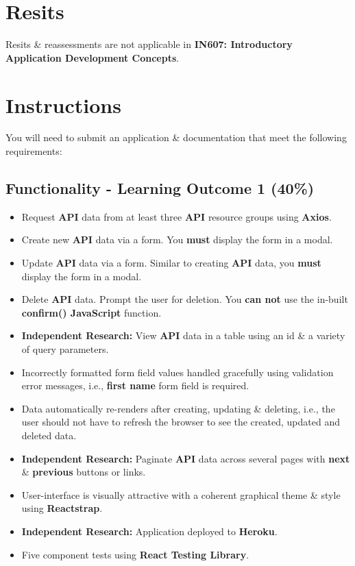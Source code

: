 \documentclass{article}
\begin{document}
\section*{Resits}
Resits \& reassessments are not applicable in \textbf{IN607: Introductory Application Development Concepts}. 

\newpage

\section*{Instructions}
You will need to submit an application \& documentation that meet the following requirements:

\subsection*{Functionality - Learning Outcome 1 (40\%)}

\begin{itemize}
        \item Request \textbf{API} data from at least three \textbf{API} resource groups using \textbf{Axios}.
        \item Create new \textbf{API} data via a form. You \textbf{must} display the form in a modal. 
        \item Update \textbf{API} data via a form. Similar to creating \textbf{API} data, you \textbf{must} display the form in a modal. 
        \item Delete \textbf{API} data. Prompt the user for deletion. You \textbf{can not} use the in-built \textbf{confirm() JavaScript} function. 
        \item \textbf{Independent Research:} View \textbf{API} data in a table using an id \& a variety of query parameters. 
        \item Incorrectly formatted form field values handled gracefully using validation error messages, i.e., \textbf{first name} form field is required.
    \item Data automatically re-renders after creating, updating \& deleting, i.e., the user should not have to refresh the browser to see the created, updated and deleted data.
    \item \textbf{Independent Research:} Paginate \textbf{API} data across several pages with \textbf{next} \& \textbf{previous} buttons or links.
        \item User-interface is visually attractive with a coherent graphical theme \& style using \textbf{Reactstrap}.
      \item \textbf{Independent Research:} Application deployed to \textbf{Heroku}. 
      \item Five component tests using \textbf{React Testing Library}.
\end{itemize}
\end{document}

